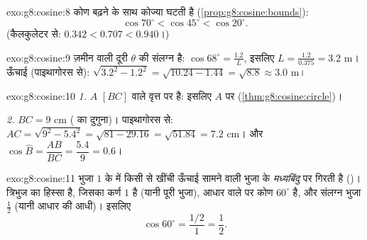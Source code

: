 \begin{solution}{exo:g8:cosine:8}
कोण बढ़ने के साथ कोज्या घटती है
(\cref{prop:g8:cosine:bounds}):
\[
\cos 70^\circ < \cos 45^\circ < \cos 20^\circ .
\]
(कैलकुलेटर से: $0.342 < 0.707 < 0.940$।)
\end{solution}

\begin{solution}{exo:g8:cosine:9}
ज़मीन वाली दूरी $\theta$ की संलग्न है:
$\cos 68^\circ = \frac{1.2}{L}$, इसलिए
$L = \frac{1.2}{0.375} = 3.2$ m। ऊँचाई (पाइथागोरस से):
$\sqrt{3.2^2 - 1.2^2} = \sqrt{10.24 - 1.44} = \sqrt{8.8} \approx 3.0$
m।
\end{solution}

\begin{solution}{exo:g8:cosine:10}
\emph{1.} $A$  $[BC]$ वाले वृत्त पर है: इसलिए $A$ पर 
(\cref{thm:g8:cosine:circle})।

\emph{2.} $BC = 9$ cm ( का दुगुना)। पाइथागोरस से:
$AC = \sqrt{9^2 - 5.4^2} = \sqrt{81 - 29.16} = \sqrt{51.84} = 7.2$
cm। और $\cos\widehat B = \dfrac{AB}{BC} = \dfrac{5.4}{9} = 0.6$।
\end{solution}

\begin{solution}{exo:g8:cosine:11}
भुजा $1$ के  में किसी  से खींची ऊँचाई सामने वाली
भुजा के \emph{मध्यबिंदु} पर गिरती है ()। त्रिभुज का 
हिस्सा  है, जिसका कर्ण $1$ है (यानी पूरी भुजा), आधार
वाले  पर कोण $60^\circ$ है, और संलग्न भुजा $\frac12$ (यानी
आधार की आधी)। इसलिए
\[
\cos 60^\circ = \frac{1/2}{1} = \frac12 .
\]
\end{solution}

